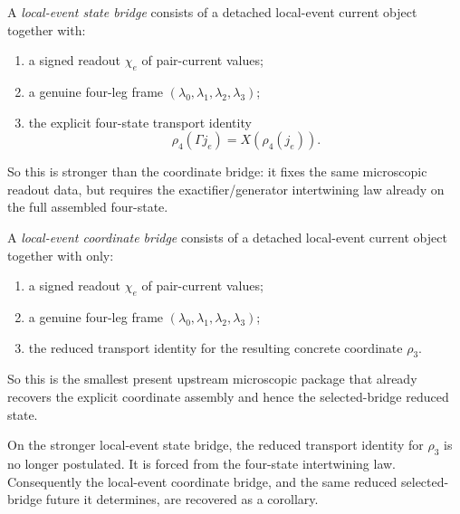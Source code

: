\begin{definition}
\label{def:local-event-state-bridge}
A \emph{local-event state bridge} consists of a detached local-event current
object together with:
\begin{enumerate}
\item a signed readout \(\chi_e\) of pair-current values;
\item a genuine four-leg frame
      \((\lambda_0,\lambda_1,\lambda_2,\lambda_3)\);
\item the explicit four-state transport identity
\[
\rho_4(\Gamma j_e)=X(\rho_4(j_e)).
\]
\end{enumerate}
So this is stronger than the coordinate bridge: it fixes the same microscopic
readout data, but requires the exactifier/generator intertwining law already on
the full assembled four-state.
\end{definition}

\begin{definition}
\label{def:local-event-coordinate-bridge}
A \emph{local-event coordinate bridge} consists of a detached local-event
current object together with only:
\begin{enumerate}
\item a signed readout \(\chi_e\) of pair-current values;
\item a genuine four-leg frame
      \((\lambda_0,\lambda_1,\lambda_2,\lambda_3)\);
\item the reduced transport identity for the resulting concrete coordinate
      \(\rho_3\).
\end{enumerate}
So this is the smallest present upstream microscopic package that already
recovers the explicit coordinate assembly and hence the selected-bridge
reduced state.
\end{definition}

\begin{theorem}
\label{thm:the-coordinate-bridge-is-derived-from-the-local-event-state-bridge}
On the stronger local-event state bridge, the reduced transport identity for
\(\rho_3\) is no longer postulated. It is forced from the four-state
intertwining law. Consequently the local-event coordinate bridge, and the same
reduced selected-bridge future it determines, are recovered as a corollary.
\end{theorem}

